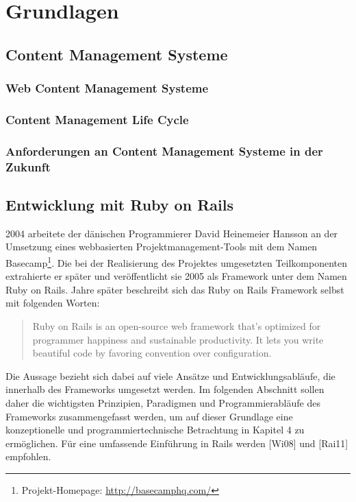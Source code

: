 \chapter{Grundlagen}

\section{Content Management Systeme}
\subsection{Web Content Management Systeme}
\subsection{Content Management Life Cycle}
\subsection{Anforderungen an Content Management Systeme in der Zukunft}


\section{Entwicklung mit Ruby on Rails}

2004 arbeitete der dänischen Programmierer David Heinemeier Hansson an der Umsetzung eines webbasierten Projektmanagement-Tools mit dem Namen Basecamp\footnote{Projekt-Homepage: \href{http://basecamphq.com/}{http://basecamphq.com/}}. Die bei der Realisierung des Projektes umgesetzten Teilkomponenten extrahierte er später und veröffentlicht sie 2005 als Framework unter dem Namen Ruby on Rails.
\newline
{} Jahre später beschreibt sich das  Ruby on Rails Framework selbst mit folgenden Worten:
\begin{quote}
Ruby on Rails is an open-source web framework that’s
optimized for programmer happiness and sustainable
productivity. It lets you write beautiful code by
favoring convention over configuration.
\end{quote}


Die Aussage bezieht sich dabei auf viele Ansätze und Entwicklungsabläufe, die innerhalb des Frameworks umgesetzt werden.
Im folgenden Abschnitt sollen daher die wichtigsten Prinzipien, Paradigmen und Programmierabläufe des Frameworks zusammengefasst werden, um auf dieser Grundlage eine konzeptionelle und programmiertechnische Betrachtung in Kapitel 4 zu ermöglichen.
\newline
\newline
Für eine umfassende Einführung in Rails werden [Wi08] und [Rai11] empfohlen.

